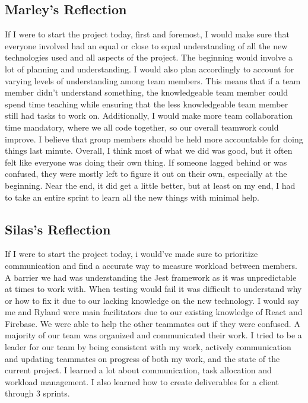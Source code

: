 \subsection{Marley's Reflection}
If I were to start the project today, first and foremost, I would make sure that everyone involved had an equal or close to equal understanding of all the new technologies used and all aspects of the project. The beginning would involve a lot of planning and understanding. I would also plan accordingly to account for varying levels of understanding among team members. This means that if a team member didn’t understand something, the knowledgeable team member could spend time teaching while ensuring that the less knowledgeable team member still had tasks to work on. Additionally, I would make more team collaboration time mandatory, where we all code together, so our overall teamwork could improve. I believe that group members should be held more accountable for doing things last minute. Overall, I think most of what we did was good, but it often felt like everyone was doing their own thing. If someone lagged behind or was confused, they were mostly left to figure it out on their own, especially at the beginning. Near the end, it did get a little better, but at least on my end, I had to take an entire sprint to learn all the new things with minimal help.



\subsection{Silas's Reflection}
If I were to start the project today, i would’ve made sure to prioritize communication and find a accurate way to measure workload between members. A barrier we had was understanding the Jest framework as it was unpredictable at times to work with. When testing would fail it was difficult to understand why or how to fix it due to our lacking knowledge on the new technology. I would say me and Ryland were main facilitators due to our existing knowledge of React and Firebase. We were able to help the other teammates out if they were confused. A majority of our team was organized and communicated their work. I tried to be a leader for our team by being consistent with my work, actively communication and updating teammates on progress of both my work, and the state of the current project. I learned a lot about communication, task allocation and workload management. I also learned how to create deliverables for a client through 3 sprints.

